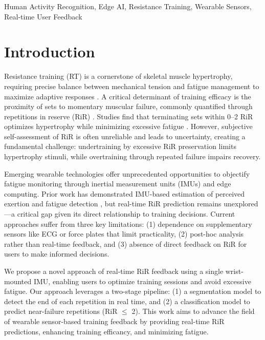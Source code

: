 \documentclass[conference]{IEEEtran}
\begin{document}
\begin{IEEEkeywords}
    Human Activity Recognition, Edge AI, Resistance Training, Wearable Sensors, Real-time User Feedback
\end{IEEEkeywords}

\section{Introduction}
Resistance training (RT) is a cornerstone of skeletal muscle hypertrophy, requiring precise balance between mechanical tension and fatigue management to maximize adaptive responses \cite{schoenfeld2010mechanisms}. A critical determinant of training efficacy is the proximity of sets to momentary muscular failure, commonly quantified through repetitions in reserve (RiR) \cite{refalo2024similar}. Studies find that terminating sets within 0--2 RiR optimizes hypertrophy while minimizing excessive fatigue \cite{refalo2024similar, izquierdo2006differential}. However, subjective self-assessment of RiR is often unreliable and leads to uncertainty, creating a fundamental challenge: undertraining by excessive RiR preservation limits hypertrophy stimuli, while overtraining through repeated failure impairs recovery.

Emerging wearable technologies offer unprecedented opportunities to objectify fatigue monitoring through inertial measurement units (IMUs) and edge computing. Prior work has demonstrated IMU-based estimation of perceived exertion \cite{albert2021using} and fatigue detection \cite{jiang2021data}, but real-time RiR prediction remains unexplored---a critical gap given its direct relationship to training decisions. Current approaches suffer from three key limitations: (1) dependence on supplementary sensors like ECG \cite{albert2021using} or force plates \cite{jiang2021data} that limit practicality, (2) post-hoc analysis rather than real-time feedback, and (3) absence of direct feedback on RiR for users to make informed decisions.

We propose a novel approach of real-time RiR feedback using a single wrist-mounted IMU, enabling users to optimize training sessions and avoid excessive fatigue. Our approach leverages a two-stage pipeline: (1) a segmentation model to detect the end of each repetition in real time, and (2) a classification model to predict near-failure repetitions (RiR $\leq$ 2). This work aims to advance the field of wearable sensor-based training feedback by providing real-time RiR predictions, enhancing training efficancy, and minimizing fatigue.
\end{document}
